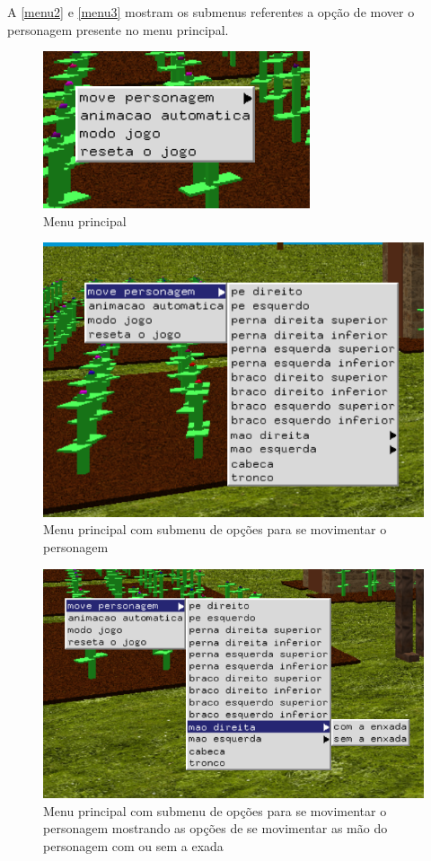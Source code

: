 \documentclass[
	12pt,				%
	openright,			%
	a4paper,			%
	english,			%
	french,				%
	spanish,			%
	brazil,				%
	]{abntex2}
\begin{document}
	A \autoref{menu2} e \autoref{menu3} mostram os submenus referentes a opção de mover o personagem presente no menu principal. 
\begin{figure}[H]
\centering 
\caption{Menu principal  } \label{menu}
\includegraphics[scale=0.8]{imagens/menudeopcoes.png}
\end{figure}

\begin{figure}[H]
\centering 
\caption{Menu principal com submenu de opções para se movimentar o personagem } \label{menu2}
\includegraphics[scale=0.8]{imagens/menudeopcoes2.png}
\end{figure}

\begin{figure}[H]
\centering 
\caption{Menu principal com submenu de opções para se movimentar o personagem mostrando as opções de se movimentar as mão do personagem com ou sem a exada } \label{menu3}
\includegraphics[scale=0.8]{imagens/menudeopcoes3.png}
\end{figure}
\end{document}
